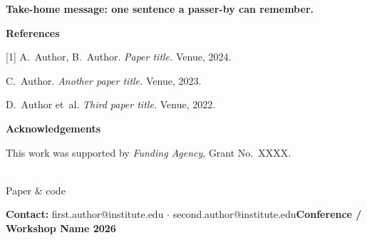 \documentclass[final]{beamer}
\makeatletter
\newcommand{\ContactEmail}   {first.author@institute.edu \;$\cdot$\; second.author@institute.edu}
\newcommand{\EventName}      {Conference / Workshop Name 2026}
\makeatother
\begin{document}
\begin{frame}[t]
\vspace{6pt}
\begin{tcolorbox}[keybox]
  \centering\bfseries Take-home message: one sentence a passer-by can remember.
\end{tcolorbox}

\vfill

\begin{tcolorbox}[enhanced,colback=white,colframe=Primary,boxrule=1.4pt,arc=0pt,
  left=10pt,right=10pt,top=6pt,bottom=6pt]
  \small
  \begin{minipage}[t]{0.52\linewidth}
    \textbf{\color{Primary}References}\par\vspace{2pt}
    [1] A.~Author, B.~Author. \emph{Paper title.} Venue, 2024.\par
    [2] C.~Author. \emph{Another paper title.} Venue, 2023.\par
    [3] D.~Author et~al. \emph{Third paper title.} Venue, 2022.
  \end{minipage}\hfill
  \begin{minipage}[t]{0.29\linewidth}
    \textbf{\color{Primary}Acknowledgements}\par\vspace{2pt}
    This work was supported by \emph{Funding Agency}, Grant No.~XXXX.   %
  \end{minipage}\hfill
  \begin{minipage}[t]{0.11\linewidth}\centering
    \\[-1pt]   %
    {\scriptsize Paper \& code}
  \end{minipage}
\end{tcolorbox}

\begin{tcolorbox}[enhanced,colback=Primary,colframe=Primary,arc=0pt,boxrule=0pt,
  left=1cm,right=1cm,top=0.3cm,bottom=0.3cm,before=\vspace{2pt},after=,
  borderline north={8pt}{0pt}{Accent}]
  \color{white}\normalsize
  \textbf{Contact:} \ContactEmail \hfill \textbf{\EventName}
\end{tcolorbox}

\end{frame}
\end{document}
